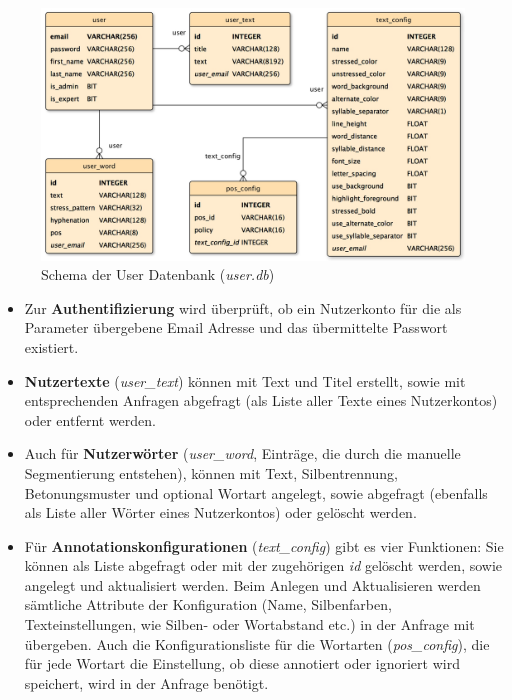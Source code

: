 \begin{figure}[h!]
	\centering
	\includegraphics[width=.8\linewidth]{figures/userservicedb}
	\caption{Schema der User Datenbank (\textit{user.db})}
	\label{fig:userdb}
\end{figure}

\begin{itemize}
	\item Zur \textbf{Authentifizierung} wird überprüft, ob ein Nutzerkonto für die als Parameter übergebene Email Adresse und das übermittelte Passwort existiert.
	
	\item \textbf{Nutzertexte} (\textit{user\_text}) können mit Text und Titel erstellt, sowie mit entsprechenden Anfragen abgefragt (als Liste aller Texte eines Nutzerkontos) oder entfernt werden.
	
	\item Auch für \textbf{Nutzerwörter} (\textit{user\_word}, Einträge, die durch die manuelle Segmentierung entstehen), können mit Text, Silbentrennung, Betonungsmuster und optional Wortart angelegt, sowie abgefragt (ebenfalls als Liste aller Wörter eines Nutzerkontos) oder gelöscht werden.
	
	\item Für \textbf{Annotationskonfigurationen} (\textit{text\_config}) gibt es vier Funktionen: Sie können als Liste abgefragt oder mit der zugehörigen \textit{id} gelöscht werden, sowie angelegt und aktualisiert werden. Beim Anlegen und Aktualisieren werden sämtliche Attribute der Konfiguration (Name, Silbenfarben, Texteinstellungen, wie Silben- oder Wortabstand etc.) in der Anfrage mit übergeben. Auch die Konfigurationsliste für die Wortarten (\textit{pos\_config}), die für jede Wortart die Einstellung, ob diese annotiert oder ignoriert wird speichert, wird in der Anfrage benötigt.
\end{itemize}



